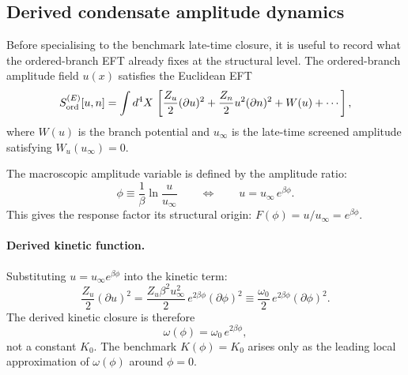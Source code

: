 \documentclass[11pt,a4paper]{article}
\numberwithin{equation}{section}
\begin{document}
\subsection{Derived condensate amplitude dynamics}
\label{sec:late_condensate_dynamics}

Before specialising to the benchmark late-time closure, it is useful
to record what the ordered-branch EFT already fixes at the structural
level.
The ordered-branch amplitude field $u(x)$ satisfies the Euclidean EFT
\begin{equation}
S_{\rm ord}^{(E)}[u,n]
=
\int d^4X\,
\left[
\frac{Z_u}{2}(\partial u)^2
+\frac{Z_n}{2}u^2(\partial n)^2
+W(u)
+\cdots
\right],
\label{eq:ordered_branch_eft_full}
\end{equation}
where $W(u)$ is the branch potential and $u_\infty$ is the late-time
screened amplitude satisfying $W_u(u_\infty)=0$.

The macroscopic amplitude variable is defined by the amplitude ratio:
\begin{equation}
\boxed{
\phi \equiv \frac{1}{\beta}\ln\!\frac{u}{u_\infty}}
\qquad\Longleftrightarrow\qquad
\boxed{u = u_\infty\, e^{\beta\phi}.}
\label{eq:phi_amplitude_relation}
\end{equation}
This gives the response factor its structural origin:
$F(\phi)=u/u_\infty=e^{\beta\phi}$.

\paragraph{Derived kinetic function.}
Substituting $u=u_\infty e^{\beta\phi}$ into the kinetic term:
\begin{equation}
\frac{Z_u}{2}(\partial u)^2
=
\frac{Z_u \beta^2 u_\infty^2}{2}\,e^{2\beta\phi}(\partial\phi)^2
\equiv
\frac{\omega_0}{2}\,e^{2\beta\phi}(\partial\phi)^2.
\label{eq:derived_kinetic}
\end{equation}
The derived kinetic closure is therefore
\begin{equation}
\boxed{\omega(\phi) = \omega_0\,e^{2\beta\phi}},
\label{eq:derived_omega}
\end{equation}
not a constant $K_0$.  The benchmark $K(\phi)=K_0$ arises only as
the leading local approximation of $\omega(\phi)$ around $\phi=0$.
\end{document}
